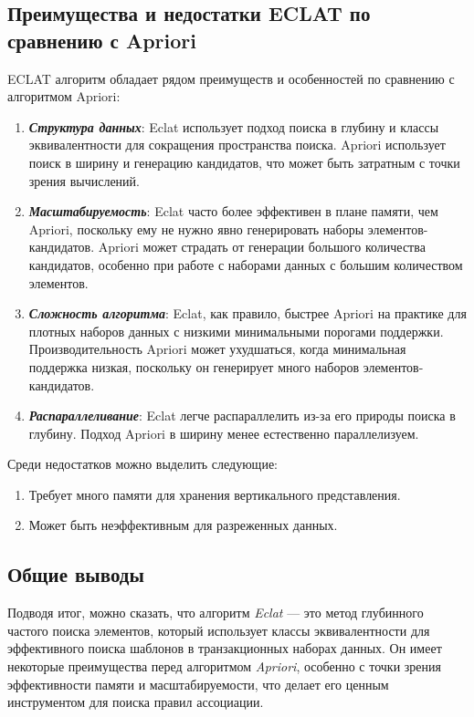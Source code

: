 \subsection{\textbf{Преимущества и недостатки ECLAT по сравнению с Apriori}}
  ECLAT алгоритм обладает рядом преимуществ и особенностей по сравнению с алгоритмом Apriori:
  \begin{enumerate}
      \item {\textbf{\textit{Структура данных}}:\newline
      Eclat использует подход поиска в глубину и классы эквивалентности для сокращения пространства поиска.\newline
      Apriori использует поиск в ширину и генерацию кандидатов, что может быть затратным с точки зрения вычислений.}
      \item {\textbf{\textit{Масштабируемость}}:\newline
      Eclat часто более эффективен в плане памяти, чем Apriori, поскольку ему не нужно явно генерировать наборы элементов-кандидатов. Apriori может страдать от генерации большого количества кандидатов, особенно при работе с наборами данных с большим количеством элементов.}
      \item {\textbf{\textit{Сложность алгоритма}}:\newline
      Eclat, как правило, быстрее Apriori на практике для плотных наборов данных с низкими минимальными порогами поддержки. Производительность Apriori может ухудшаться, когда минимальная поддержка низкая, поскольку он генерирует много наборов элементов-кандидатов.}
      \item {\textbf{\textit{Распараллеливание}}:\newline
      Eclat легче распараллелить из-за его природы поиска в глубину. Подход Apriori в ширину менее естественно параллелизуем.}
  \end{enumerate}
  Среди недостатков можно выделить следующие:
  \begin{enumerate}
      \item {Требует много памяти для хранения вертикального представления.}
      \item {Может быть неэффективным для разреженных данных.}
  \end{enumerate}
\subsection{Общие выводы}
Подводя итог, можно сказать, что алгоритм \textit{Eclat} — это метод глубинного частого поиска элементов, который использует классы эквивалентности для эффективного поиска шаблонов в транзакционных наборах данных. Он имеет некоторые преимущества перед алгоритмом \textit{Apriori}, особенно с точки зрения эффективности памяти и масштабируемости, что делает его ценным инструментом для поиска правил ассоциации.

